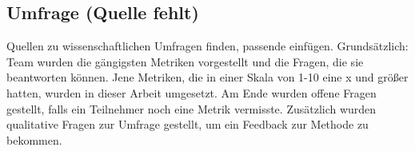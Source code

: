 \subsection{Umfrage (Quelle fehlt)}

Quellen zu wissenschaftlichen Umfragen finden, passende einfügen.
Grundsätzlich: Team wurden die gängigsten Metriken vorgestellt und die Fragen, die sie beantworten können.
Jene Metriken, die in einer Skala von 1-10 eine x und größer hatten, wurden in dieser Arbeit umgesetzt.
Am Ende wurden offene Fragen gestellt, falls ein Teilnehmer noch eine Metrik vermisste.
Zusätzlich wurden qualitative Fragen zur Umfrage gestellt, um ein Feedback zur Methode zu bekommen.
